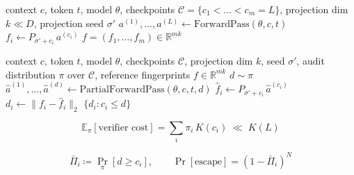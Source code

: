 \documentclass[10pt]{extarticle}
\begin{document}
\setcounter{algorithm}{1}
\noindent
\begin{minipage}[t]{0.48\textwidth}
\vspace{0pt}
\begin{algorithm}[H]
\caption{Multi-Checkpoint Fingerprint Collection}
\begin{algorithmic}[1]
\REQUIRE context $c$, token $t$, model $\theta$, checkpoints $\mathcal{C}=\{c_1<\dots<c_m=L\}$, projection dim $k\ll D$, projection seed $\sigma'$
\STATE $a^{(1)},\dots,a^{(L)} \leftarrow \mathrm{ForwardPass}(\theta,c,t)$
  \STATE $f_i \leftarrow P_{\sigma'+c_i}\, a^{(c_i)}$
\ENDFOR
\RETURN $f = (f_1,\dots,f_m) \in \mathbb{R}^{mk}$
\end{algorithmic}
\end{algorithm}
\end{minipage}\hfill
\begin{minipage}[t]{0.48\textwidth}
\vspace{0pt}
\begin{algorithm}[H]
\caption{Randomized-Depth Fingerprint Matching}
\begin{algorithmic}[1]
\REQUIRE context $c$, token $t$, model $\theta$, checkpoints $\mathcal{C}$, projection dim $k$, seed $\sigma'$, audit distribution $\pi$ over $\mathcal{C}$, reference fingerprints $f\in\mathbb{R}^{mk}$
\STATE $d \sim \pi$
\STATE $\hat a^{(1)},\dots,\hat a^{(d)} \leftarrow \mathrm{PartialForwardPass}(\theta,c,t,d)$
  \STATE $\hat f_i \leftarrow P_{\sigma'+c_i}\, \hat a^{(c_i)}$
  \STATE $d_i \leftarrow \|f_i - \hat f_i\|_2$
\ENDFOR
\RETURN $\{d_i : c_i \le d\}$
\end{algorithmic}
\end{algorithm}
\end{minipage}

\vspace{0.8em}
\noindent
\begin{minipage}[t]{0.48\textwidth}
\[
  \mathbb{E}_\pi[\text{verifier cost}] = \textstyle\sum_i \pi_i\,K(c_i) \;\ll\; K(L)
\]
\end{minipage}\hfill
\begin{minipage}[t]{0.48\textwidth}
\[
  \bar\Pi_i\coloneqq\Pr_\pi[d\ge c_i],\qquad
  \Pr[\text{escape}] = (1-\bar\Pi_i)^{N}
\]
\end{minipage}
\end{document}
